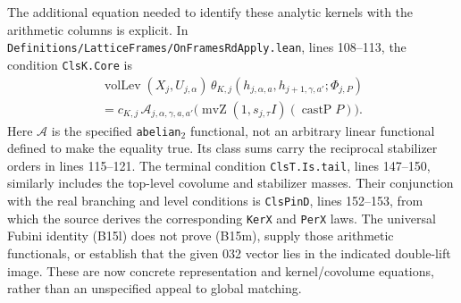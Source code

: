 The additional equation needed to identify these analytic kernels with the arithmetic columns is explicit. In \texttt{Definitions/\allowbreak{}LatticeFrames/\allowbreak{}OnFramesRdApply.lean}, lines 108--113, the condition \texttt{ClsK.Core} is
\begin{equation}
\begin{gathered}
 \operatorname{volLev}(X_j,U_{j,\alpha})\,
 \theta_{K,j}(h_{j,\alpha,a},h_{j+1,\gamma,a'};\Phi_{j,P})
 \\
 =c_{K,j}\,\mathcal A_{j,\alpha,\gamma,a,a'}
       \bigl(\operatorname{mvZ}(1,s_{j,\tau}I)(\operatorname{castP}P)\bigr).
\end{gathered}
 \tag{B15m}
\end{equation}
Here $\mathcal A$ is the specified \texttt{abelian\ensuremath{_2}} functional, not an arbitrary linear functional defined to make the equality true. Its class sums carry the reciprocal stabilizer orders in lines 115--121. The terminal condition \texttt{ClsT.Is.tail}, lines 147--150, similarly includes the top-level covolume and stabilizer masses. Their conjunction with the real branching and level conditions is \texttt{ClsPinD}, lines 152--153, from which the source derives the corresponding \texttt{KerX} and \texttt{PerX} laws. The universal Fubini identity (B15l) does not prove (B15m), supply those arithmetic functionals, or establish that the given 032 vector lies in the indicated double-lift image. These are now concrete representation and kernel/covolume equations, rather than an unspecified appeal to global matching.
